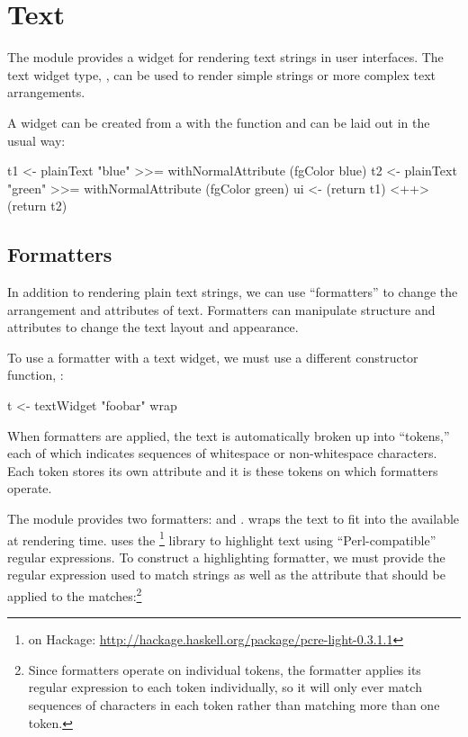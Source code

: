 \section{Text}
\label{sec:text}

The  module provides a widget for rendering text strings in
user interfaces.  The text widget type, , can
be used to render simple strings or more complex text arrangements.

A  widget can be created from a  with the
 function and can be laid out in the usual way:

\begin{haskellcode}
 t1 <- plainText "blue" >>= withNormalAttribute (fgColor blue)
 t2 <- plainText "green" >>= withNormalAttribute (fgColor green)
 ui <- (return t1) <++> (return t2)
\end{haskellcode}

\subsection{Formatters}

In addition to rendering plain text strings, we can use ``formatters''
to change the arrangement and attributes of text.  Formatters can
manipulate structure and attributes to change the text layout and
appearance.

To use a formatter with a text widget, we must use a different
constructor function, :

\begin{haskellcode}
 t <- textWidget "foobar" wrap
\end{haskellcode}

When formatters are applied, the text is automatically broken up into
``tokens,'' each of which indicates sequences of whitespace or
non-whitespace characters.  Each token stores its own attribute and it
is these tokens on which formatters operate.

The  module provides two formatters:  and
.   wraps the text to fit into the
 available at rendering time.   uses
the \footnote{ on Hackage:
  \href{http://hackage.haskell.org/package/pcre-light-0.3.1.1}{http://hackage.haskell.org/package/pcre-light-0.3.1.1}}
library to highlight text using ``Perl-compatible'' regular
expressions.  To construct a highlighting formatter, we must provide
the regular expression used to match strings as well as the attribute
that should be applied to the matches:\footnote{Since
  formatters operate on individual tokens, the 
  formatter applies its regular expression to each token individually,
  so it will only ever match sequences of characters in each token
  rather than matching more than one token.}

